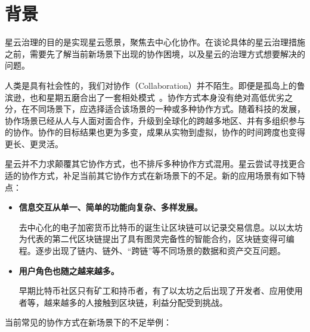 \section{背景}

星云治理的目的是实现星云愿景，聚焦去中心化协作。在谈论具体的星云治理措施之前，需要先了解当前新场景下出现的协作困境，以及星云的治理方式想要解决的问题。

人类是具有社会性的，我们对协作（Collaboration）并不陌生。即便是孤岛上的鲁滨逊，也和星期五磨合出了一套相处模式~\cite{robinson}。协作方式本身没有绝对高低优劣之分，在不同场景下，应选择适合该场景的一种或多种协作方式。随着科技的发展，协作场景已经从人与人面对面合作，升级到全球化的跨越多地区、并有多组织参与的协作。协作的目标结果也更为多变，成果从实物到虚拟，协作的时间跨度也变得更长、更灵活。

星云并不力求颠覆其它协作方式，也不排斥多种协作方式混用。星云尝试寻找更合适的协作方式，补足当前其它协作方式在新场景下的不足。新的应用场景有如下特点：

\begin{itemize}
	\item \textbf{信息交互从单⼀、简单的功能向复杂、多样发展。}
	
	去中心化的电子加密货币比特币的诞生让区块链可以记录交易信息。以以太坊为代表的第二代区块链提出了具有图灵完备性的智能合约，区块链变得可编程。逐步出现了链内、链外、“跨链”等不同场景的数据和资产交互问题。

	\item \textbf{用户角色也随之越来越多。}

	早期比特币社区只有矿工和持币者，有了以太坊之后出现了开发者、应用使用者等，越来越多的人接触到区块链，利益分配受到挑战。

\end{itemize}

当前常见的协作方式在新场景下的不足举例：

